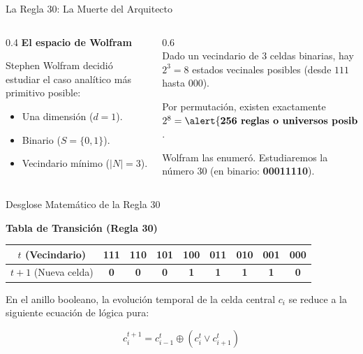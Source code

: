 \documentclass[10pt, aspectratio=169]{beamer}
\begin{document}
\begin{frame}{La Regla 30: La Muerte del Arquitecto}
    \begin{columns}
        \begin{column}{0.4\textwidth}
            \vspace{0.2cm}
            \Large \textbf{El espacio de Wolfram}
            
            \vspace{0.4cm}
            \normalsize
            Stephen Wolfram decidió estudiar el caso analítico más primitivo posible:
            \begin{itemize}
                \item Una dimensión ($d=1$).
                \item Binario ($S=\{0,1\}$).
                \item Vecindario mínimo ($|N|=3$).
            \end{itemize}
        \end{column}
        \begin{column}{0.6\textwidth}
            \vspace{0.5cm}
           \\  Dado un vecindario de 3 celdas binarias, hay $2^3 = 8$ estados vecinales posibles (desde $111$ hasta $000$).
            
            \vspace{0.4cm}
            Por permutación, existen exactamente $2^8 = \alert{\textbf{256 reglas o universos posibles}}$.
            
            \vspace{0.4cm}
            Wolfram las enumeró. Estudiaremos la número 30 (en binario: \textbf{00011110}).
        \end{column}
    \end{columns}
\end{frame}

\begin{frame}{Desglose Matemático de la Regla 30}
    \begin{center}
        \textbf{Tabla de Transición (Regla 30)}
        
        \vspace{0.4cm}
        \begin{tabular}{|c|c|c|c|c|c|c|c|c|}
            \hline
            $t$ (Vecindario) & 111 & 110 & 101 & 100 & 011 & 010 & 001 & 000 \\
            \hline
            $t+1$ (Nueva celda) & \textbf{0} & \textbf{0} & \textbf{0} & \textbf{1} & \textbf{1} & \textbf{1} & \textbf{1} & \textbf{0} \\
            \hline
        \end{tabular}
        
        \vspace{0.8cm}
        
        \normalsize
        En el anillo booleano, la evolución temporal de la celda central $c_i$ se reduce a la siguiente ecuación de lógica pura:
        
        \huge
        $$c_i^{t+1} = c_{i-1}^t \oplus (c_i^t \lor c_{i+1}^t)$$
    \end{center}
\end{frame}
\end{document}
